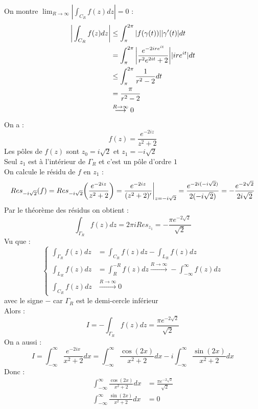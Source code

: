 On montre $\lim_{R \to \infty} |\int_{C_R} f(z) dz| = 0$ :
\begin{align*}
    \bigg{|}\int_{C_R} f(z)dz\bigg{|} &\leq \int_\pi^{2\pi} |f(\gamma(t))||\gamma'(t)|dt \\
    &= \int_\pi^{2\pi} \bigg{|} \frac{e^{-2ire^{it}}}{r^2e^{2it}+2} \bigg{|} |ire^{it}| dt \\
    &\leq \int_\pi^{2\pi} \frac{1}{r^2 - 2} dt \\
    &= \frac{\pi}{r^2 - 2} \\
    &\overset{R \to \infty}{\longrightarrow} 0
\end{align*}
On a :
$$f(z) = \frac{e^{-2iz}}{z^2+2}$$
Les pôles de $f(z)$ sont $z_0 = i\sqrt{2}$ et $z_1 = -i\sqrt{2}$ \\
Seul $z_1$ est à l'intérieur de $\Gamma_R$ et c'est un pôle d'ordre $1$ \\
On calcule le résidu de $f$ en $z_1$ :
$$Res_{-i\sqrt{2}}(f) = Res_{-i\sqrt{2}}\bigg{(}\frac{e^{-2iz}}{z^2+2}\bigg{)}= \frac{e^{-2iz}}{(z^2+2)'} \bigg{|}_{z=-i\sqrt{2}} = \frac{e^{-2i(-i\sqrt{2})}}{2(-i\sqrt{2})} = -\frac{e^{-2\sqrt{2}}}{2i\sqrt{2}}$$
Par le théorème des résidus on obtient :
$$\int_{\Gamma_R} f(z) dz = 2\pi i Res_{z_1} = -\frac{\pi e^{-2\sqrt{2}}}{\sqrt{2}}$$
Vu que :
$$
\begin{cases}
    \int_{\Gamma_R} f(z) dz &= \int_{C_R} f(z) dz - \int_{L_R} f(z) dz \\
    \int_{L_R} f(z) dz &= \int_{R}^{-R} f(z) dz \overset{R \to \infty}{\longrightarrow} -\int_{-\infty}^{\infty} f(z) dz \\
    \int_{C_R} f(z) dz &\overset{R \to \infty}{\longrightarrow} 0
\end{cases}
$$
avec le signe $-$ car $\Gamma_R$ est le demi-cercle inférieur \\
Alors :
$$I = -\int_{\Gamma_R} f(z) dz = \frac{\pi e^{-2\sqrt{2}}}{\sqrt{2}}$$
On a aussi :
$$I = \int_{-\infty}^{\infty} \frac{e^{-2ix}}{x^2+2}dx = \int_{-\infty}^{\infty} \frac{\cos(2x)}{x^2+2}dx - i \int_{-\infty}^{\infty} \frac{\sin(2x)}{x^2+2}dx$$
Donc :
\begin{align*}
    \int_{-\infty}^{\infty} \frac{\cos(2x)}{x^2+2}dx &= \frac{\pi e^{-2\sqrt{2}}}{\sqrt{2}}\\
    \int_{-\infty}^{\infty} \frac{\sin(2x)}{x^2+2}dx &= 0
\end{align*}
